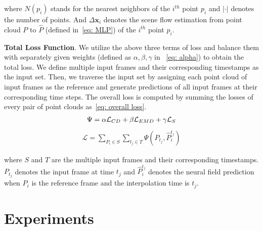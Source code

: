 \documentclass[10pt,twocolumn,letterpaper]{article}
\begin{document}
\noindent where $N(p_{i})$ stands for the nearest neighbors of the $i^{th}$ point $ p_{i} $ and $ \left| \cdot \right|$ denotes the number of points. And $ \Delta \mathbf{x}_i $ denotes the scene flow estimation  from point cloud $  P $ to $ \hat{P} $ (defined in~\cref{eq: MLP}) of the $i^{th}$ point $ p_{i} $.



\textbf{Total Loss Function}. We utilize the above three terms of loss and balance them with separately given weights (defined as $\alpha, \beta, \gamma$ in ~\cref{eq: alpha}) to obtain the total loss. We define multiple input frames and their corresponding timestamps as the input set. Then, we traverse the input set by assigning each point cloud of input frames as the reference and generate predictions of all input frames at their corresponding time steps. The overall loss is computed by summing the losses of every pair of point clouds as~\cref{eq: overall loss}.
\vspace{-0.1cm}
\begin{equation}
\setlength\belowdisplayskip{0.05cm}
\begin{split}
\label{eq: alpha}
    \Psi= \alpha \mathcal{L}_{CD} + \beta \mathcal{L}_{EMD} + \gamma \mathcal{L}_{S}
\end{split}
\end{equation}
\vspace{-.4cm}
\begin{equation}
\label{eq: overall loss}
\begin{split}
    \mathcal{L}=\sum_{P_i \in S} \sum_{t_j \in T} \Psi \left(P_{t_j}, \hat{P}_{i}^{t_{j}}\right)
\end{split}
\end{equation}

\noindent where $S$ and $T$ are the multiple input frames and their corresponding timestamps. $ P_{t_j} $ denotes the input frame at time $ t_j $ and $ \hat{P}_{i}^{t_{j}} $ denotes the neural field prediction when $ P_i $ is the reference frame and the interpolation time is $t_j$. 




\section{Experiments}
\label{sec: experiments}
\end{document}
